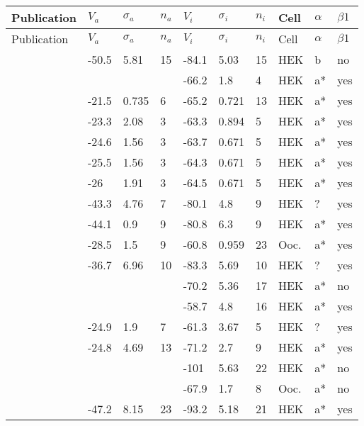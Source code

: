 \startrowcolors
\begin{longtable}{p{5cm}|lll|lll|lll}
\hline
Publication & $V_a$ & $\sigma_a$  & $n_a$ & $V_i$ & $\sigma_i$  & $n_i$ & Cell & $\alpha$ & $\beta1$ \\
\hline
\endfirsthead
\hline
\rowcolor{white}
Publication & $V_a$ & $\sigma_a$  & $n_a$ & $V_i$ & $\sigma_i$  & $n_i$ & Cell & $\alpha$ & $\beta1$ \\
\hline
\endhead
\hline
\endfoot
\citet{Abe2014MutationDB} & -50.5 & 5.81 & 15 & -84.1 & 5.03 & 15 & HEK & b & no \\
\citet{Abriel2000MutationDB} & && & -66.2 & 1.8 & 4 & HEK & a* & yes \\
\citet{Abriel2001MutationDB} & -21.5 & 0.735 & 6 & -65.2 & 0.721 & 13 & HEK & a* & yes \\
\citet{Abriel2001MutationDB} & -23.3 & 2.08 & 3 & -63.3 & 0.894 & 5 & HEK & a* & yes \\
\citet{Abriel2001MutationDB} & -24.6 & 1.56 & 3 & -63.7 & 0.671 & 5 & HEK & a* & yes \\
\citet{Abriel2001MutationDB} & -25.5 & 1.56 & 3 & -64.3 & 0.671 & 5 & HEK & a* & yes \\
\citet{Abriel2001MutationDB} & -26 & 1.91 & 3 & -64.5 & 0.671 & 5 & HEK & a* & yes \\
\citet{Aiba2014MutationDB} & -43.3 & 4.76 & 7 & -80.1 & 4.8 & 9 & HEK & ? & yes \\
\citet{Akai2000MutationDB} & -44.1 & 0.9 & 9 & -80.8 & 6.3 & 9 & HEK & a* & yes \\
\citet{Albert2008MutationDB} & -28.5 & 1.5 & 9 & -60.8 & 0.959 & 23 & Ooc. & a* & yes \\
\citet{Amin2005MutationDB} & -36.7 & 6.96 & 10 & -83.3 & 5.69 & 10 & HEK & ? & yes \\
\citet{An1998MutationDB} & && & -70.2 & 5.36 & 17 & HEK & a* & no \\
\citet{An1998MutationDB} & && & -58.7 & 4.8 & 16 & HEK & a* & yes \\
\citet{Bankston2007aMutationDB} & -24.9 & 1.9 & 7 & -61.3 & 3.67 & 5 & HEK & ? & yes \\
\citet{Bankston2007bMutationDB} & -24.8 & 4.69 & 13 & -71.2 & 2.7 & 9 & HEK & a* & yes \\
\citet{Baroudi2000aMutationDB} & && & -101 & 5.63 & 22 & HEK & a* & no \\
\citet{Baroudi2000aMutationDB} & && & -67.9 & 1.7 & 8 & Ooc. & a* & no \\
\citet{Baroudi2000bMutationDB} & -47.2 & 8.15 & 23 & -93.2 & 5.18 & 21 & HEK & a* & yes \\

\end{longtable}
